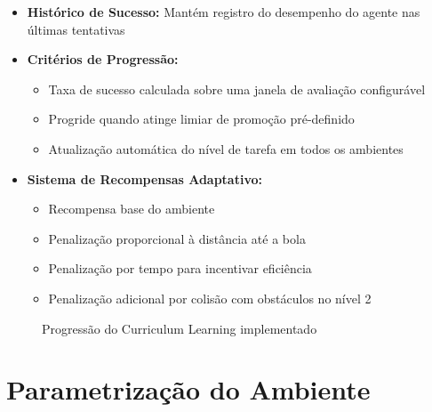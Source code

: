 \begin{itemize}
    \item \textbf{Histórico de Sucesso:} Mantém registro do desempenho do agente nas últimas tentativas

    \item \textbf{Critérios de Progressão:}
    \begin{itemize}
        \item Taxa de sucesso calculada sobre uma janela de avaliação configurável
        \item Progride quando atinge limiar de promoção pré-definido
        \item Atualização automática do nível de tarefa em todos os ambientes
    \end{itemize}

    \item \textbf{Sistema de Recompensas Adaptativo:}
    \begin{itemize}
        \item Recompensa base do ambiente
        \item Penalização proporcional à distância até a bola
        \item Penalização por tempo para incentivar eficiência
        \item Penalização adicional por colisão com obstáculos no nível 2
    \end{itemize}
\end{itemize}

\begin{figure}[H]
    \centering
    \caption{Progressão do Curriculum Learning implementado}
    \label{fig:curriculum_progression}
\end{figure}



\section{Parametrização do Ambiente}

